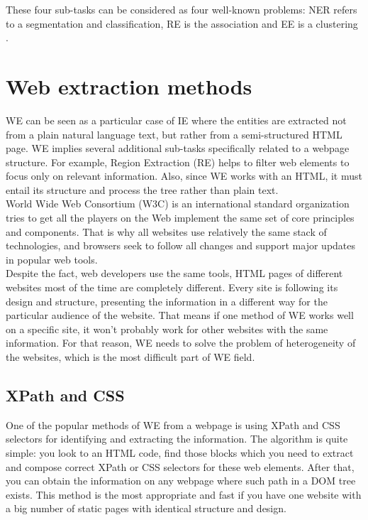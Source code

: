 These four sub-tasks can be considered as four well-known problems: NER refers to a segmentation and classification, RE is the association and EE is a clustering \cite{ManLect}.\\

\section{Web extraction methods}


WE can be seen as a particular case of IE where the entities are extracted not from a plain natural language text, but rather from a semi-structured HTML page. WE implies several additional sub-tasks specifically related to a webpage structure. For example, Region Extraction (RE) helps to filter web elements to focus only on relevant information. Also, since WE works with an HTML, it must entail its structure and process the tree rather than plain text. \\

World Wide Web Consortium (W3C) is an international standard organization tries to get all the players on the Web implement the same set of core principles and components. That is why all websites use relatively the same stack of technologies, and browsers seek to follow all changes and support major updates in popular web tools.\\

Despite the fact, web developers use the same tools, HTML pages of different websites most of the time are completely different. Every site is following its design and structure, presenting the information in a different way for the particular audience of the website. That means if one method of WE works well on a specific site, it won't probably work for other websites with the same information. For that reason, WE needs to solve the problem of heterogeneity of the websites, which is the most difficult part of WE field.

\subsection{XPath and CSS}

One of the popular methods of WE from a webpage is using XPath and CSS selectors for identifying and extracting the information. The algorithm is quite simple: you look to an HTML code, find those blocks which you need to extract and compose correct XPath or CSS selectors for these web elements. After that, you can obtain the information on any webpage where such path in a DOM tree exists.  This method is the most appropriate and fast if you have one website with a big number of static pages with identical structure and design. \\

